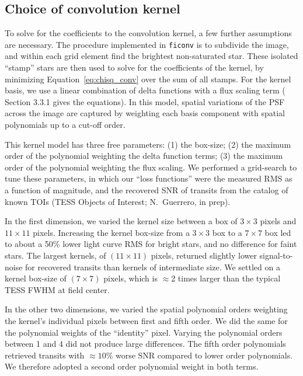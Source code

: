\documentclass[12pt,twocolumn,tighten]{aastex62}
\begin{document}
\subsection{Choice of convolution kernel}

To solve for the coefficients to the convolution kernel, a
few further assumptions are necessary.  The procedure implemented in
\texttt{ficonv} is to subdivide the image, and within each grid
element find the brightest non-saturated star. These isolated
``stamp'' stars are then used to solve for the coefficients of the
kernel, by minimizing Equation~\ref{eq:chisq_conv} over the sum of all
stamps.  For the kernel basis, we use a linear combination of
delta functions with a flux scaling term
(\citealt{soares-furtado_image_2017} Section 3.3.1 gives the
equations).  In this model, spatial variations of the PSF across the
image are captured by weighting each basis component with spatial
polynomials up to a cut-off order.


This kernel model has three free parameters: (1) the box-size; 
(2) the maximum order of the polynomial weighting the delta
function terms; (3) the maximum order of the polynomial weighting the
flux scaling.  We performed a grid-search to tune these parameters, in
which our ``loss functions'' were the measured RMS as a function
of magnitude, and the recovered SNR of transits from the catalog
of known TOIs (TESS Objects of Interest; N.~Guerrero, in prep).

In the first dimension, we varied the kernel size between a box of
$3\times3$ pixels and $11\times11$ pixels.  Increasing the kernel
box-size from a $3\times3$ box to a $7\times7$ box led to about a 50\%
lower light curve RMS for bright stars, and no difference for faint
stars.  The largest kernels, of $(11\times11)$ pixels, returned
slightly lower signal-to-noise for recovered transits than kernels
of intermediate size.  We settled on a kernel box-size of $(7\times7)$
pixels, which is $\approx$2 times larger than the typical TESS FWHM
at field center. 

In the other two dimensions, we varied the spatial polynomial orders
weighting the kernel's individual pixels between first and fifth
order.  We did the same for the polynomial weights of the ``identity''
pixel.  Varying the polynomial orders between 1 and 4 did not produce
large differences.  The fifth order polynomials retrieved transits
with $\approx10\%$ worse SNR compared to lower order polynomials.  We
therefore adopted a second order polynomial weight in both terms.
\end{document}
